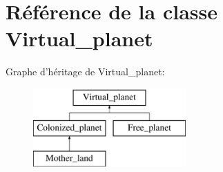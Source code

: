 \hypertarget{classVirtual__planet}{\section{Référence de la classe Virtual\-\_\-planet}
\label{classVirtual__planet}
}
Graphe d'héritage de Virtual\-\_\-planet\-:\begin{figure}[H]
\begin{center}
\leavevmode
\includegraphics[height=3.000000cm]{classVirtual__planet}
\end{center}
\end{figure}
